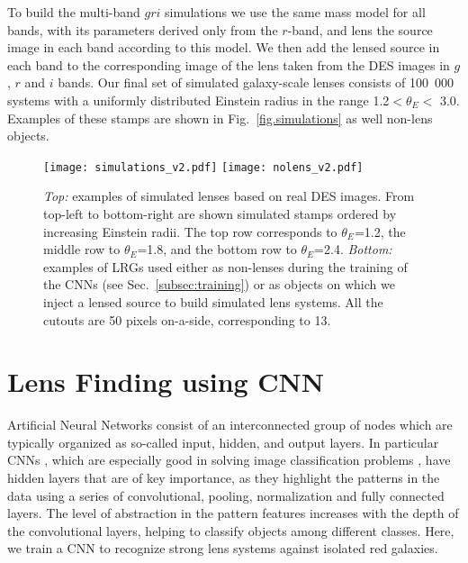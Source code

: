 \documentclass[tradiabstract,twocolumn]{aa}
\begin{document}
To build the multi-band $gri$ simulations we use the same mass model for all bands, with its parameters derived only from the $r$-band, and lens the source image in each band according to this model. We then add the lensed source in each band to the corresponding image of the lens taken from the DES images in $g$, $r$ and $i$ bands. Our final set of simulated galaxy-scale lenses consists of 100~000 systems with a uniformly distributed Einstein radius in the range 1.2\arcsec $< \theta_E <$ 3.0\arcsec. Examples of these stamps are shown in Fig.~\ref{fig.simulations} as well non-lens objects.



\begin{figure}[t!]
\centering
\texttt{[image: simulations\_v2.pdf]}
\texttt{[image: nolens\_v2.pdf]}
\caption{{\it Top:} examples of simulated lenses based on real DES images. From top-left to bottom-right are  shown simulated stamps ordered by increasing Einstein radii. The top row corresponds to $\theta_E$=1.2\arcsec, the middle row to $\theta_E$=1.8\arcsec, and the bottom row to $\theta_E$=2.4\arcsec. {\it Bottom:} examples of LRGs used either as non-lenses during the training of the CNNs (see Sec.~\ref{subsec:training}) or as objects on which we inject a lensed source to build simulated lens systems. All the cutouts are 50 pixels on-a-side, corresponding to 13\arcsec \label{fig.simulations}. }
\label{FigGam}%
\end{figure}

\section{Lens Finding using CNN}\label{sec:cnn}

Artificial Neural Networks \citep[ANNs;][]{Rosenblatt1957} consist of an interconnected group of nodes which are typically organized as so-called input, hidden, and output layers. In particular CNNs \citep{LeCun1989}, which are especially good in solving image classification problems \citep{He2015}, have hidden layers that are of key importance, as they highlight the patterns in the data using a series of convolutional, pooling, normalization and fully connected layers. The level of abstraction in the pattern features increases with the depth of the convolutional layers, helping to classify objects among different classes. Here, we train a CNN to recognize strong lens systems against isolated red galaxies. 
\end{document}
